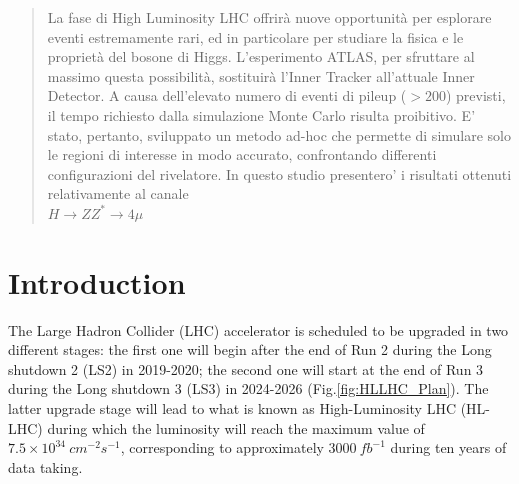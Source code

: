 \documentclass[a4paper,twoside,12pt]{article}
\begin{document}


\maketitle


\tableofcontents
\newpage

\begin{abstract}
La fase di High Luminosity LHC offrirà nuove opportunità per esplorare eventi estremamente rari, ed in particolare per studiare la fisica e le proprietà del bosone di Higgs.
L’esperimento ATLAS, per sfruttare al massimo questa possibilità, sostituirà l’Inner Tracker  all’attuale Inner Detector.
A causa dell'elevato numero di eventi di pileup ($>200$) previsti, il tempo richiesto dalla simulazione Monte Carlo risulta proibitivo. E’ stato, pertanto, sviluppato un metodo ad-hoc che permette di simulare solo le regioni di interesse in modo accurato, confrontando differenti configurazioni del rivelatore. In questo studio presentero' i risultati ottenuti relativamente al canale\\ {$H\rightarrow ZZ^*\rightarrow 4\mu$}
\end{abstract}

\newpage

\section{Introduction} \label{sec:introduction}
The Large Hadron Collider (LHC) accelerator is scheduled to be upgraded in two different stages: the first one will begin after the end of Run 2 during the Long shutdown 2 (LS2) in 2019-2020; the second one will start at the end of Run 3 during the Long shutdown 3 (LS3) in 2024-2026 (Fig.\ref{fig:HLLHC_Plan}). The latter upgrade stage will lead to what is known as High-Luminosity LHC (HL-LHC) during which the
luminosity will reach the maximum value of $7.5 \times 10^{34}\ cm^{-2}s^{-1}$, corresponding to approximately $3000\ fb^{-1}$ during ten years of data taking. \\
\end{document}
